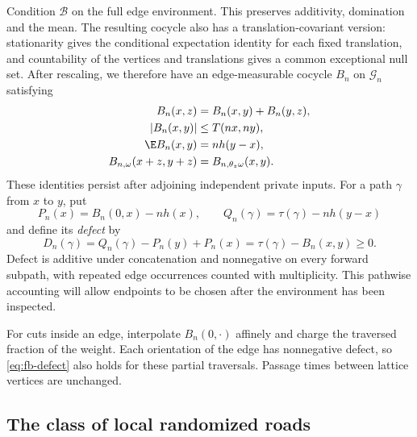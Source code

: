 Condition $\mathcal B$ on the full edge environment.  This preserves
additivity, domination and the mean.  The resulting cocycle also has a
translation-covariant version: stationarity gives the conditional
expectation identity for each fixed translation, and countability of
the vertices and translations gives a common exceptional null set.
After rescaling, we therefore have an edge-measurable cocycle $B_n$ on
$\mathcal G_n$ satisfying
\begin{equation}
 \begin{split}
 B_n(x,z)&=B_n(x,y)+B_n(y,z),\\
 |B_n(x,y)|&\le T(nx,ny),\\
 \E B_n(x,y)&=n h(y-x),\\
 B_{n,\omega}(x+z,y+z)&=B_{n,\theta_z\omega}(x,y).
 \end{split}
 \label{eq:fb-calibration}
\end{equation}
These identities persist after adjoining independent private inputs.
For a path $\gamma$ from $x$ to $y$, put
\[
 P_n(x)=B_n(0,x)-nh(x),\qquad
 Q_n(\gamma)=\tau(\gamma)-nh(y-x)
\]
and define its \emph{defect} by
\begin{equation}
 D_n(\gamma)
 =Q_n(\gamma)-P_n(y)+P_n(x)
 =\tau(\gamma)-B_n(x,y)\ge0.
 \label{eq:fb-defect}
\end{equation}
Defect is additive under concatenation and nonnegative on every
forward subpath, with repeated edge occurrences counted with
multiplicity.  This pathwise accounting will allow endpoints to be
chosen after the environment has been inspected.

For cuts inside an edge, interpolate $B_n(0,\cdot)$ affinely and charge
the traversed fraction of the weight.  Each orientation of the edge
has nonnegative defect, so \eqref{eq:fb-defect} also holds for these
partial traversals.  Passage times between lattice vertices are
unchanged.

\subsection{The class of local randomized roads}
\label{sec:fb-roads}

